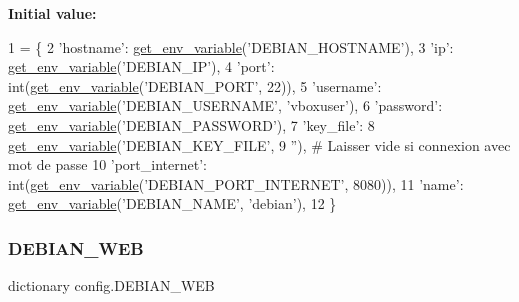 {\bfseries Initial value\+:}
\begin{DoxyCode}
1 =  \{
2     \textcolor{stringliteral}{'hostname'}: \hyperlink{namespaceconfig_a7cf1bd9315cd5f3237441a2d9414082d}{get\_env\_variable}(\textcolor{stringliteral}{'DEBIAN\_HOSTNAME'}),
3     \textcolor{stringliteral}{'ip'}: \hyperlink{namespaceconfig_a7cf1bd9315cd5f3237441a2d9414082d}{get\_env\_variable}(\textcolor{stringliteral}{'DEBIAN\_IP'}),
4     \textcolor{stringliteral}{'port'}: int(\hyperlink{namespaceconfig_a7cf1bd9315cd5f3237441a2d9414082d}{get\_env\_variable}(\textcolor{stringliteral}{'DEBIAN\_PORT'}, 22)),
5     \textcolor{stringliteral}{'username'}: \hyperlink{namespaceconfig_a7cf1bd9315cd5f3237441a2d9414082d}{get\_env\_variable}(\textcolor{stringliteral}{'DEBIAN\_USERNAME'}, \textcolor{stringliteral}{'vboxuser'}),
6     \textcolor{stringliteral}{'password'}: \hyperlink{namespaceconfig_a7cf1bd9315cd5f3237441a2d9414082d}{get\_env\_variable}(\textcolor{stringliteral}{'DEBIAN\_PASSWORD'}),
7     \textcolor{stringliteral}{'key\_file'}:
8     \hyperlink{namespaceconfig_a7cf1bd9315cd5f3237441a2d9414082d}{get\_env\_variable}(\textcolor{stringliteral}{'DEBIAN\_KEY\_FILE'},
9                      \textcolor{stringliteral}{''}),  \textcolor{comment}{# Laisser vide si connexion avec mot de passe}
10     \textcolor{stringliteral}{'port\_internet'}: int(\hyperlink{namespaceconfig_a7cf1bd9315cd5f3237441a2d9414082d}{get\_env\_variable}(\textcolor{stringliteral}{'DEBIAN\_PORT\_INTERNET'}, 8080)),
11     \textcolor{stringliteral}{'name'}: \hyperlink{namespaceconfig_a7cf1bd9315cd5f3237441a2d9414082d}{get\_env\_variable}(\textcolor{stringliteral}{'DEBIAN\_NAME'}, \textcolor{stringliteral}{'debian'}),
12 \}
\end{DoxyCode}
\mbox{\label{namespaceconfig_aff8b756685a16564c3e9cd25f0164ed0}} 
\subsubsection{\texorpdfstring{D\+E\+B\+I\+A\+N\+\_\+\+W\+EB}{DEBIAN\_WEB}}
{\footnotesize\ttfamily dictionary config.\+D\+E\+B\+I\+A\+N\+\_\+\+W\+EB}

